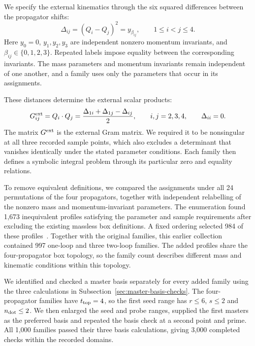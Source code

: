 \documentclass[11pt,a4paper]{article}
\begin{document}
We specify the external kinematics through the six squared differences
between the propagator shifts:
\begin{equation}
 \Delta_{ij}=(Q_i-Q_j)^2=y_{\beta_{ij}},
 \qquad 1\leq i<j\leq4.
 \label{eq:expanded-distances}
\end{equation}
Here $y_0=0$, $y_1,y_2,y_3$ are independent nonzero momentum invariants,
and $\beta_{ij}\in\{0,1,2,3\}$. Repeated labels impose equality between
the corresponding invariants. The mass parameters and momentum
invariants remain independent of one another, and a family uses only
the parameters that occur in its assignments.

These distances determine the external scalar products:
\begin{equation}
 G^{\rm ext}_{ij}=Q_i\cdot Q_j
 =\frac{\Delta_{1i}+\Delta_{1j}-\Delta_{ij}}{2},
 \qquad i,j=2,3,4,\qquad \Delta_{ii}=0.
 \label{eq:expanded-gram}
\end{equation}
The matrix $G^{\rm ext}$ is the external Gram matrix. We required it
to be nonsingular at all three recorded sample points, which also
excludes a determinant that vanishes identically under the stated
parameter conditions. Each family then defines a symbolic integral
problem through its particular zero and equality relations.

To remove equivalent definitions, we compared the assignments under
all 24 permutations of the four propagators, together with independent
relabelling of the nonzero mass and momentum-invariant parameters.
The enumeration found 1,673 inequivalent profiles satisfying the
parameter and sample requirements after excluding the existing
massless box definitions. A fixed ordering selected 984 of these
profiles~\cite{ExpandedIntegralData}. Together with the original
families, this earlier collection contained 997 one-loop and three two-loop
families. The added profiles share the four-propagator box topology,
so the family count describes different mass and kinematic conditions
within this topology.

We identified and checked a master basis separately for every added
family using the three calculations in
Subsection~\ref{sec:master-basis-checks}.
The four-propagator families have $t_{\rm top}=4$, so the first seed
range has $r\leq6$, $s\leq2$ and $n_{\rm dot}\leq2$. We then enlarged
the seed and probe ranges, supplied the first masters as the preferred
basis and repeated the basis check at a second point and prime.
All 1,000 families passed their three basis calculations, giving
3,000 completed checks within the recorded domains.
\end{document}
